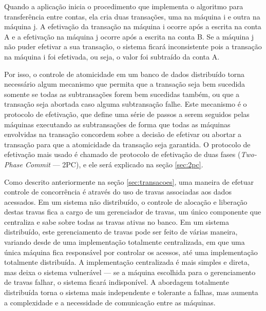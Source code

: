 \documentclass[11pt,twoside,a4paper]{book}
\begin{document}
Quando a aplicação inicia o procedimento que implementa o algoritmo para transferência entre contas, ela cria duas transações, uma na máquina i e outra na máquina j. A efetivação da transação na máquina i ocorre após a escrita na conta A e a efetivação na máquina j ocorre após a escrita na conta B. Se a máquina j não puder efetivar a sua transação, o sistema ficará inconsistente pois a transação na máquina i foi efetivada, ou seja, o valor foi subtraído da conta A.

Por isso, o controle de atomicidade em um banco de dados distribuído torna necessário algum mecanismo que permita que a transação seja bem sucedida somente se todas as subtransações forem bem sucedidas também, ou que a transação seja abortada caso alguma subtransação falhe. Este mecanismo é o protocolo de efetivação, que define uma série de passos a serem seguidos pelas máquinas executando as subtransações de forma que todas as máquinas envolvidas na transação concordem sobre a decisão de efetivar ou abortar a transação para que a atomicidade da transação seja garantida. O protocolo de efetivação mais usado é chamado de protocolo de efetivação de duas fases (\emph{Two-Phase Commit} --- 2PC), e ele será explicado na seção \ref{sec:2pc}.


Como descrito anteriormente na seção \ref{sec:transacoes}, uma maneira de efetuar controle de concorrência é através do uso de travas associadas aos dados acessados. Em um sistema não distribuído, o controle de alocação e liberação destas travas fica a cargo de um gerenciador de travas, um único componente que centraliza e sabe sobre todas as travas ativas no banco. Em um sistema distribuído, este gerenciamento de travas pode ser feito de várias maneira, variando desde de uma implementação totalmente centralizada, em que uma única máquina fica responsável por controlar os acessos, até uma implementação totalmente distribuída. A implementação centralizada é mais simples e direta, mas deixa o sistema vulnerável --- se a máquina escolhida para o gerenciamento de travas falhar, o sistema ficará indisponível. A abordagem totalmente distribuída torna o sistema mais independente e tolerante a falhas, mas aumenta a complexidade e a necessidade de comunicação entre as máquinas.
\end{document}
